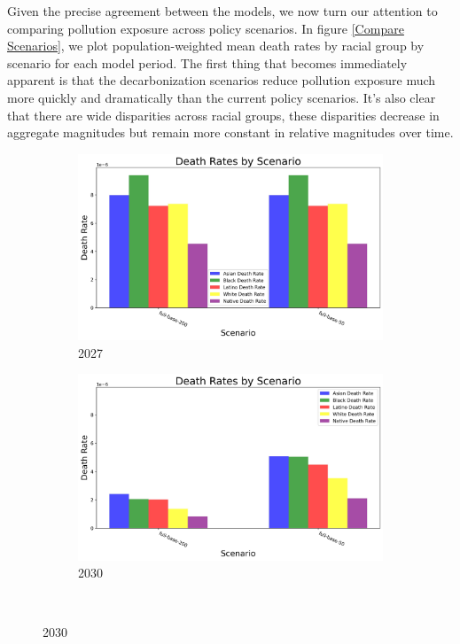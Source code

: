 \documentclass[a4paper]{article}
\theoremstyle{definition}
\theoremstyle{plain}
\begin{document}
Given the precise agreement between the models, we now turn our attention to comparing pollution exposure across policy scenarios.  In figure \ref{Compare Scenarios}, we plot population-weighted mean death rates by racial group by scenario for each model period.  The first thing that becomes immediately apparent is that the decarbonization scenarios reduce pollution exposure much more quickly and dramatically than the current policy scenarios.  It's also clear that there are wide disparities across racial groups, these disparities decrease in aggregate magnitudes but remain more constant in relative magnitudes over time.
\begin{figure}
    \centering
    \begin{subfigure}[b]{0.45\textwidth}
        \includegraphics[width=\textwidth]{Figures/Output/ISRM_deathrate_by_scenario_2027.jpg}
        \caption{2027}
        \label{Subfig1}
    \end{subfigure}
    \hfill
    \begin{subfigure}[b]{0.45\textwidth}
        \includegraphics[width=\textwidth]{Figures/Output/ISRM_deathrate_by_scenario_2030.jpg}
        \caption{2030}
        \label{Subfig2}
    \end{subfigure}\\


\end{figure}
\end{document}
